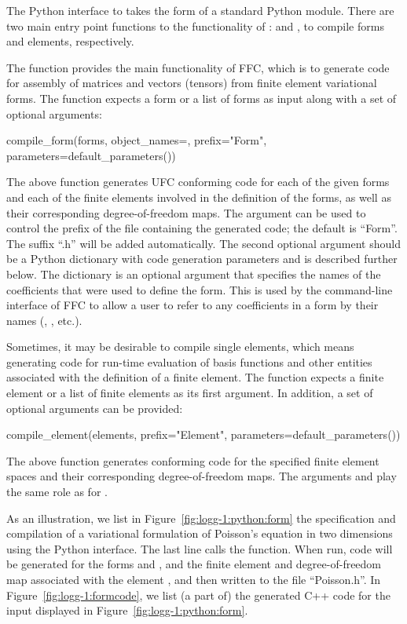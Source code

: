 The Python interface to \ffc{} takes the form of a standard
Python module. There are two main entry point functions to the
functionality of \ffc{}:  and
, to compile forms and elements, respectively.

The  function provides the main functionality of
FFC, which is to generate code for assembly of matrices and vectors
(tensors) from finite element variational
forms. The  function expects a form or a list of
forms as input along with a set of optional arguments:
%
\begin{python}
compile_form(forms,
             object_names={},
             prefix="Form",
             parameters=default_parameters())
\end{python}
%
The above function generates UFC conforming code for each of the given
forms and each of the finite elements involved in the definition of
the forms, as well as their corresponding degree-of-freedom
maps. The  argument can be used to control the prefix of
the file containing the generated code; the default is ``Form''. The
suffix ``.h'' will be added automatically. The second optional argument
 should be a Python dictionary with code
generation parameters and is described further below.
The  dictionary is an optional argument that
specifies the names of the coefficients that were used to define the
form. This is used by the command-line interface of FFC to allow a
user to refer to any coefficients in a form by their names
(, , etc.).

Sometimes, it may be desirable to compile single elements, which means
generating code for run-time evaluation of basis functions and other
entities associated with the definition of a finite element.
The  function expects a finite element or a list
of finite elements as its first argument. In addition, a set of
optional arguments can be provided:
%
\begin{python}
compile_element(elements,
                prefix="Element",
                parameters=default_parameters())
\end{python}
%
The above function generates \ufc{} conforming code for the specified
finite element spaces and their corresponding degree-of-freedom maps.
The arguments  and
 play the same role as for
.

As an illustration, we list in Figure~\ref{fig:logg-1:python:form} the
specification and compilation of a variational formulation of
Poisson's equation in two dimensions using the Python interface. The
last line calls the  function. When run, code will
be generated for the forms  and , and the finite element
and degree-of-freedom map associated with the element
, and then written to the file ``Poisson.h''.
In Figure~\ref{fig:logg-1:formcode}, we list (a part of) the generated
C++ code for the input displayed in Figure~\ref{fig:logg-1:python:form}.

